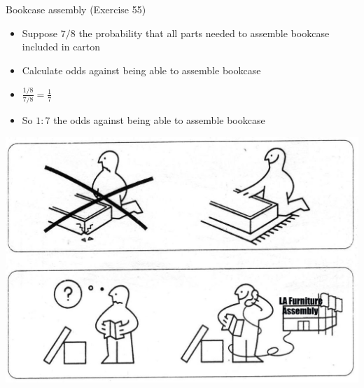 \documentclass[handout]{beamer}
\theoremstyle{definition}
\begin{document}
\begin{frame}{Bookcase assembly (Exercise 55)}
\begin{multicols}{2}
\begin{itemize}
\item Suppose $7/8$ the probability that
all parts needed to assemble bookcase included in carton
\item Calculate odds against being able to assemble bookcase
\item $\frac{1/8}{7/8}=\frac{1}{7}$
\columnbreak
\item So $1:7$ the odds against being able to assemble bookcase
\end{itemize}
\includegraphics[scale=.15]{Ikea}
\end{multicols}
\end{frame}
\end{document}
